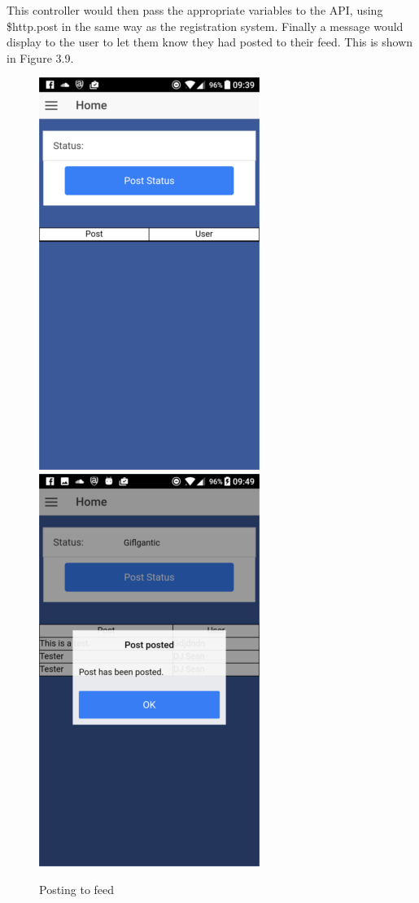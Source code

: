 This controller would then pass the appropriate variables to the API, using \$http.post in the same way as the registration system. Finally a message would display to the user to let them know they had posted to their feed. This is shown in Figure 3.9.
\begin{center}
\begin{figure}[H]
\begin{center}
\includegraphics[scale=0.5]{images/sc10}
\includegraphics[scale=0.5]{images/sc11}
\end{center}
\caption{Posting to feed}
\end{figure}
\end{center}

